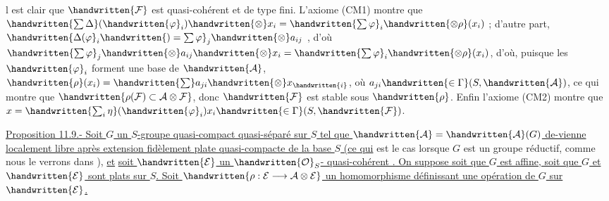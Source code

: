 l est clair que $\handwritten{\mathcal{F}}$ est quasi-cohérent et de type fini. L'axiome (CM1) montre que $\handwritten{\sum\Delta}(\handwritten{\varphi}_i)\handwritten{\otimes}x_i=\handwritten{\sum\varphi}_i\handwritten{\otimes\rho}(x_i)$ ; d'autre part, $\handwritten{\Delta(\varphi}_i\handwritten{)=\sum\varphi}_j\handwritten{\otimes}a_{ij}$ , d'où $\handwritten{\sum\varphi}_j\handwritten{\otimes}a_{ij}\handwritten{\otimes}x_i=\handwritten{\sum\varphi}_i\handwritten{\otimes\rho}(x_i)$, d'où, puisque les $\handwritten{\varphi}_i$ forment une base de $\handwritten{\mathcal{A}}$, $\handwritten{\rho}(x_i)=\handwritten{\sum}a_{ji}\handwritten{\otimes}x_{\handwritten{i}}$, où $a_{ji}\handwritten{\in\Gamma}(S,\handwritten{\mathcal{A}})$, ce qui montre que $\handwritten{\rho(\mathcal{F})\subset\mathcal{A}\otimes\mathcal{F}}$, donc $\handwritten{\mathcal{F}}$ est stable sous $\handwritten{\rho}$. Enfin l'axiome (CM2) montre que $x=\handwritten{\sum_i\eta}(\handwritten{\varphi}_i)x_i\handwritten{\in\Gamma}(S,\handwritten{\mathcal{F}})$.

\uline{Proposition 11.9.- Soit $G$ un $S$-groupe quasi-compact quasi-séparé sur $S$ tel que $\handwritten{\mathcal{A}}=\handwritten{\mathcal{A}}(G)$ de-\linebreak vienne localement libre après extension fidèlement plate quasi-compacte de la base $S$ (ce qui} est le cas lorsque $G$ est un groupe réductif, comme nous le verrons dans  ), \uline{et} \uline{soit $\handwritten{\mathcal{E}}$ un $\handwritten{\mathcal{O}}_S$- quasi-cohérent . On suppose soit que $G$ est affine, soit que $G$ et $\handwritten{\mathcal{E}}$ sont plats sur $S$. Soit $\handwritten{\rho:\mathcal{E}\longrightarrow\mathcal{A}\otimes\mathcal{E}}$ un homomorphisme définissant une opération de $G$ sur $\handwritten{\mathcal{E}}$.}
